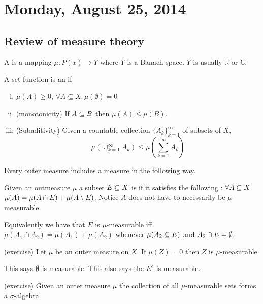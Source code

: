 \section{Monday, August 25, 2014}

\subsection{Review of measure theory}

\begin{defn}
  A  is a mapping $\mu:P(x) \to Y$ where $Y$ is a
  Banach space. $Y$ is usually $\mathbb{R}$ or $\mathbb{C}$.
\end{defn}

\begin{defn}
  A set function is an  if
  \begin{enumerate}[(i)]
    \item $\mu(A)\ge 0,\, \forall A\subseteq X, \mu(\emptyset)=0$
    \item (monotonicity) If $A\subseteq B$ then $\mu(A)\le \mu(B)$.
    \item (Subaditivity) Given a countable collection
      $\{A_k\}_{k=1}^\infty$ of subsets of $X$,
      \begin{equation*}
        \mu(\cup_{k=1}^\infty A_k)\le \mu\left(\sum_{k=1}^\infty A_k\right)
      \end{equation*}
  \end{enumerate}
\end{defn}

\begin{fact}
  Every outer measure includes a measure in the following way.
\end{fact}

\begin{defn}
  Given an outmeasure $\mu$ a subset $E\subseteq X$ is  if
  it satisfies the following : $\forall
  A\subseteq X$ $\mu(A) = \mu(A\cap E)+\mu(A\setminus E)$. Notice $A$ does not have
  to necessarily be $\mu$-measurable.

  Equivalently we have that $E$ is $\mu$-measurable iff
  $\mu(A_1\cap A_2) = \mu(A_1)+\mu(A_2)$ whenever $\mu(A_2\subseteq E)$ and
  $A_2\cap E=\emptyset$.
\end{defn}

\begin{prop}(exercise)
  Let $\mu$ be an outer measure on $X$. If $\mu(Z) = 0$ then $Z$ is
  $\mu$-measurable.
\end{prop}
\begin{note}
  This says $\emptyset$ is measurable. This also says the $E^c$ is
  measurable.
\end{note}
\begin{prop}
  (exercise) Given an outer measure $\mu$ the collection of all
  $\mu$-measurable sets forms a $\sigma$-algebra.
\end{prop}

